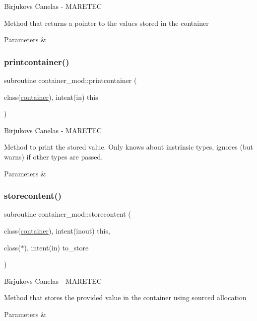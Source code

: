 Birjukovs Canelas -\/ M\+A\+R\+E\+T\+EC 

Method that returns a pointer to the values stored in the container 
\begin{DoxyParams}{Parameters}
{\em } & \\
\hline
\end{DoxyParams}
\mbox{\label{namespacecontainer__mod_abf1785185971a527e437d3a489462724}} 
\subsubsection{\texorpdfstring{printcontainer()}{printcontainer()}}
{\footnotesize\ttfamily subroutine container\+\_\+mod\+::printcontainer (\begin{DoxyParamCaption}\item[{class(\hyperlink{structcontainer__mod_1_1container}{container}), intent(in)}]{this }\end{DoxyParamCaption})\hspace{0.3cm}{\ttfamily [private]}}



Birjukovs Canelas -\/ M\+A\+R\+E\+T\+EC 

Method to print the stored value. Only knows about instrinsic types, ignores (but warns) if other types are passed. 
\begin{DoxyParams}{Parameters}
{\em } & \\
\hline
\end{DoxyParams}
\mbox{\label{namespacecontainer__mod_ace49cee012b6cd3c41c03556ab0dd884}} 
\subsubsection{\texorpdfstring{storecontent()}{storecontent()}}
{\footnotesize\ttfamily subroutine container\+\_\+mod\+::storecontent (\begin{DoxyParamCaption}\item[{class(\hyperlink{structcontainer__mod_1_1container}{container}), intent(inout)}]{this,  }\item[{class($\ast$), intent(in)}]{to\+\_\+store }\end{DoxyParamCaption})\hspace{0.3cm}{\ttfamily [private]}}



Birjukovs Canelas -\/ M\+A\+R\+E\+T\+EC 

Method that stores the provided value in the container using sourced allocation 
\begin{DoxyParams}{Parameters}
{\em } & \\
\hline
\end{DoxyParams}
